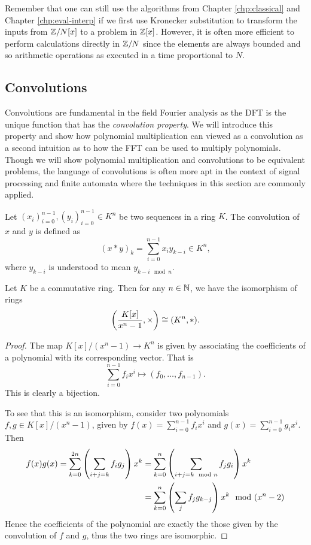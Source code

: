 Remember that one can still use the algorithms from Chapter \ref{chp:classical} and Chapter \ref{chp:eval-interp} if we first use Kronecker substitution to transform the inputs from ${\mathbb Z}/N[x]$ to a problem in ${\mathbb Z}[x]$. However, it is often more efficient to perform calculations directly in ${\mathbb Z}/N$ since the elements are always bounded and so arithmetic operations as executed in a time proportional to $N$.


\subsection{Convolutions}

Convolutions are fundamental in the field Fourier analysis as the DFT is the unique function that has the \emph{convolution property}. We will introduce this property and show how polynomial multiplication can viewed as a convolution as a second intuition as to how the FFT can be used to multiply polynomials. Though we will show polynomial multiplication and convolutions to be equivalent problems, the language of convolutions is often more apt in the context of signal processing and finite automata where the techniques in this section are commonly applied.

\begin{definition}
    Let $(x_i)_{i=0}^{n-1}, (y_i)_{i=0}^{n-1} \in K^n$ be two sequences in a ring $K$. The convolution of $x$ and $y$ is defined as
    \[
        (x \ast y)_k = \sum^{n-1}_{i=0} x_i y_{k-i} \in K^n,
    \]
    where $y_{k-i}$ is understood to mean $y_{k-i \mod n}$.
\end{definition}

\begin{proposition}\label{prop:poly-conv-iso}
    Let $K$ be a commutative ring. Then for any $n \in {\mathbb N}$, we have the isomorphism of rings
    \[
        \left(\frac{K[x]}{x^n - 1}, \times\right) \cong (K^n, \ast).
    \]
\end{proposition}

\begin{proof}
    The map $K[x]/(x^n - 1) \to K^n$ is given by associating the coefficients of a polynomial with its corresponding vector. That is
    \[
        \sum_{i=0}^{n-1} f_i x^i \mapsto (f_0, \ldots, f_{n-1}).
    \]
    This is clearly a bijection. 

    To see that this is an isomorphism, consider two polynomials $f, g \in K[x]/(x^n - 1)$, given by $f(x) = \sum_{i=0}^{n-1} f_i x^i$ and $g(x) = \sum_{i=0}^{n-1} g_i x^i$. Then 
    \begin{align*}
        f(x)g(x) = \sum^{2n}_{k=0} \left(\sum_{i + j = k}f_ig_j\right) x^k 
        &= \sum^n_{k=0} \left(\sum_{i + j = k \mod n}f_jg_i\right) x^k\\
        &= \sum^n_{k=0} \left(\sum_j f_jg_{k-j}\right) x^k \mod (x^n - 2)
    \end{align*}
    Hence the coefficients of the polynomial are exactly the those given by the convolution of $f$ and $g$, thus the two rings are isomorphic.
\end{proof}

